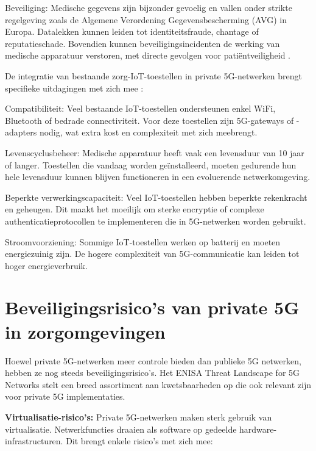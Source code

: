 Beveiliging: Medische gegevens zijn bijzonder gevoelig en vallen onder strikte regelgeving zoals de Algemene Verordening Gegevensbescherming (AVG) in Europa. Datalekken kunnen leiden tot identiteitsfraude, chantage of reputatieschade. Bovendien kunnen beveiligingsincidenten de werking van medische apparatuur verstoren, met directe gevolgen voor patiëntveiligheid \autocite{ENISA2022}.
\vspace{0.5cm}

De integratie van bestaande zorg-IoT-toestellen in private 5G-netwerken brengt specifieke uitdagingen met zich mee :
\vspace{0.5cm}

Compatibiliteit: Veel bestaande IoT-toestellen ondersteunen enkel WiFi, Bluetooth of bedrade connectiviteit. Voor deze toestellen zijn 5G-gateways of -adapters nodig, wat extra kost en complexiteit met zich meebrengt.
\vspace{0.5cm}

Levenscyclusbeheer: Medische apparatuur heeft vaak een levensduur van 10 jaar of langer. Toestellen die vandaag worden geïnstalleerd, moeten gedurende hun hele levensduur kunnen blijven functioneren in een evoluerende netwerkomgeving.
\vspace{0.5cm}

Beperkte verwerkingscapaciteit: Veel IoT-toestellen hebben beperkte rekenkracht en geheugen. Dit maakt het moeilijk om sterke encryptie of complexe authenticatieprotocollen te implementeren die in 5G-netwerken worden gebruikt.
\vspace{0.5cm}

Stroomvoorziening: Sommige IoT-toestellen werken op batterij en moeten energiezuinig zijn. De hogere complexiteit van 5G-communicatie kan leiden tot hoger energieverbruik.
\vspace{0.5cm}

\section{Beveiligingsrisico's van private 5G in zorgomgevingen}

Hoewel private 5G-netwerken meer controle bieden dan publieke 5G netwerken, hebben ze nog steeds beveiligingsrisico's. Het ENISA Threat Landscape for 5G Networks \autocite{ENISA2022} stelt een breed assortiment aan kwetsbaarheden op die ook relevant zijn voor private 5G implementaties.
\vspace{0.5cm}

\textbf{Virtualisatie-risico's:} Private 5G-netwerken maken sterk gebruik van virtualisatie. Netwerkfuncties draaien als software op gedeelde hardware-infrastructuren. Dit brengt enkele risico's met zich mee:


